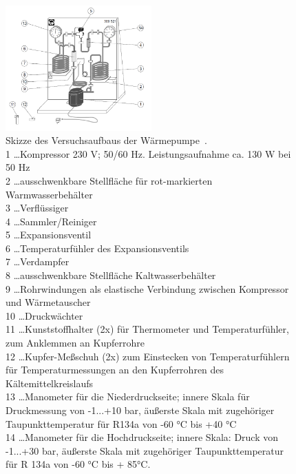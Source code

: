 \documentclass[12pt,english,ngerman]{scrartcl}
\begin{document}
\begin{figure}[H]
	\begin{center}
		\includegraphics[width =0.5\textwidth]{./figures/warmepumpe_skizze.PNG}
	\end{center}
	\caption[Skizze des Versuchsaufbaus der Wärmepumpe]{Skizze des Versuchsaufbaus der
		Wärmepumpe~\cite[text]{hohenau_warmepumpe_2014}.                          \\
		1 \dots Kompressor 230 V; 50/60 Hz. Leistungsaufnahme ca. 130 W bei 50 Hz \\
		2 \dots ausschwenkbare Stellfläche für rot-markierten Warmwasserbehälter  \\
		3 \dots Verflüssiger                                                      \\
		4 \dots Sammler/Reiniger                                                  \\
		5 \dots Expansionsventil                                                  \\
		6 \dots Temperaturfühler des Expansionsventils                            \\
		7 \dots Verdampfer                                                        \\
		8 \dots ausschwenkbare Stellfläche Kaltwasserbehälter                     \\
		9 \dots Rohrwindungen als elastische Verbindung zwischen Kompressor und
		Wärmetauscher                                                             \\
		10 \dots Druckwächter                                                     \\
		11 \dots Kunststoffhalter (2x) für Thermometer und Temperaturfühler, zum
		Anklemmen an Kupferrohre                                                  \\
		12 \dots Kupfer-Meßschuh (2x) zum Einstecken von Temperaturfühlern für
		Temperaturmessungen an den Kupferrohren des Kältemittelkreislaufs         \\
		13 \dots Manometer für die Niederdruckseite; innere Skala für Druckmessung von
		-1...+10 bar, äußerste Skala mit zugehöriger Taupunkttemperatur für R134a von
		-60 °C bis +40 °C                                                         \\
		14 \dots Manometer für die Hochdruckseite; innere Skala: Druck von -1...+30
		bar, äußerste Skala mit zugehöriger Taupunkttemperatur für R 134a von -60 °C
		bis + 85°C.
	}\label{fig:skizze_warmepumpe}
\end{figure}
\end{document}
